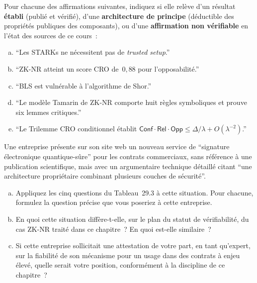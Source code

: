 \bigskip

\begin{boxexo}[title={\ding{45}\quad Exercice~29.1. Distinguer les statuts \niveaubase}]
Pour chacune des affirmations suivantes, indiquez si elle relève
d'un résultat \textbf{établi} (publié et vérifié), d'une
\textbf{architecture de principe} (déductible des propriétés
publiques des composants), ou d'une \textbf{affirmation non
vérifiable} en l'état des sources de ce cours~:
\begin{enumerate}[(a)]
    \item ``Les STARKs ne nécessitent pas de \textit{trusted
          setup}.''
    \item ``ZK-NR atteint un score CRO de~$0{,}88$ pour
          l'opposabilité.''
    \item ``BLS est vulnérable à l'algorithme de Shor.''
    \item ``Le modèle Tamarin de ZK-NR comporte huit règles
          symboliques et prouve six lemmes critiques.''
    \item ``Le Trilemme CRO conditionnel établit
          $\mathsf{Conf}\cdot\mathsf{Rel}\cdot\mathsf{Opp} \leq
          \Delta/\lambda + O(\lambda^{-2})$.''
\end{enumerate}
\end{boxexo}

\begin{boxexo}[title={\ding{45}\quad Exercice~29.2. Appliquer la grille de lecture \niveaumoyen}]
Une entreprise présente sur son site web un nouveau service de
``signature électronique quantique-sûre'' pour les contrats
commerciaux, sans référence à une publication scientifique, mais
avec un argumentaire technique détaillé citant ``une architecture
propriétaire combinant plusieurs couches de sécurité''.
\begin{enumerate}[(a)]
    \item Appliquez les cinq questions du Tableau~29.3 à cette
          situation. Pour chacune, formulez la question précise
          que vous poseriez à cette entreprise.
    \item En quoi cette situation diffère-t-elle, sur le plan du
          statut de vérifiabilité, du cas ZK-NR traité dans ce
          chapitre~? En quoi est-elle similaire~?
    \item Si cette entreprise sollicitait une attestation de votre
          part, en tant qu'expert, sur la fiabilité de son
          mécanisme pour un usage dans des contrats à enjeu élevé,
          quelle serait votre position, conformément à la
          discipline de ce chapitre~?
\end{enumerate}
\end{boxexo}

